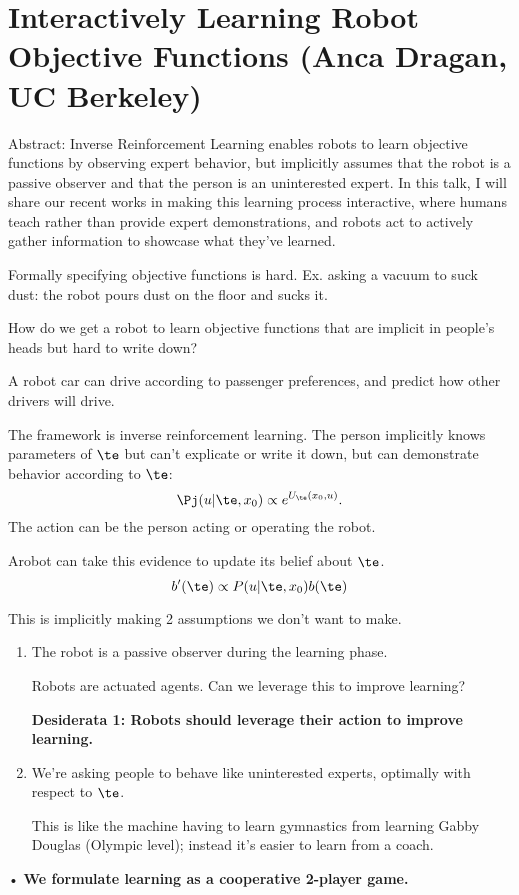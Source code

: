 \section{Interactively Learning Robot Objective Functions (Anca Dragan, UC Berkeley)}

Abstract: Inverse Reinforcement Learning enables robots to learn objective functions by observing expert behavior, but implicitly assumes that the robot is a passive observer and that the person is an uninterested expert. In this talk, I will share our recent works in making this learning process interactive, where humans teach rather than provide expert demonstrations, and robots act to actively gather information to showcase what they've learned.

Formally specifying objective functions is hard. Ex. asking a vacuum to suck dust: the robot pours dust on the floor and sucks it.

How do we get a robot to learn objective functions that are implicit in people's heads but hard to write down?

A robot car can drive according to passenger preferences, and predict how other drivers will drive.

The framework is inverse reinforcement learning. The person implicitly knows parameters of $\te$ but can't explicate or write it down, but can demonstrate behavior according to $\te$:
$$
\Pj(u|\te, x_0)\propto e^{U_\te(x_0,u)}.
$$
The action can be the person acting or operating the robot.

Arobot can take this evidence to update its belief about $\te$.
$$b'(\te) \propto P(u|\te,x_0)b(\te)$$

This is implicitly making 2 assumptions we don't want to make.
\begin{enumerate}
\item
The robot is a passive observer during the learning phase.

Robots are actuated agents. Can we leverage this to improve learning?

\textbf{Desiderata 1: Robots should leverage their action to improve learning.}
\item
We're asking people to behave like uninterested experts, optimally with respect to $\te$. 

This is like the machine having to learn gymnastics from learning Gabby Douglas (Olympic level); instead it's easier to learn from a coach.


\end{enumerate}•
\textbf{We formulate learning as a cooperative 2-player game.}

